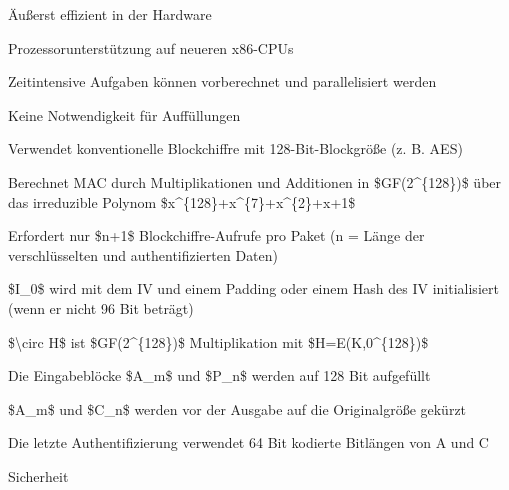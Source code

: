 \documentclass[a4paper]{article}
\begin{document}
\begin{multicols}{3}
\begin{itemize*}
            \begin{itemize*}
                  \item Äußerst effizient in der Hardware
                  \item Prozessorunterstützung auf neueren x86-CPUs
                  \item Zeitintensive Aufgaben können vorberechnet und parallelisiert werden
                  \item Keine Notwendigkeit für Auffüllungen
            \end{itemize*}
            \item
            Verwendet konventionelle Blockchiffre mit 128-Bit-Blockgröße (z. B.
            AES)
            \item
            Berechnet MAC durch Multiplikationen und Additionen in
            \$GF(2\^{}\{128\})\$ über das irreduzible Polynom
            \$x\^{}\{128\}+x\^{}\{7\}+x\^{}\{2\}+x+1\$
            \item
            Erfordert nur \$n+1\$ Blockchiffre-Aufrufe pro Paket (n = Länge der
            verschlüsselten und authentifizierten Daten)

            \begin{itemize*}
                  \item \$I\_0\$ wird mit dem IV und einem Padding oder einem Hash des IV initialisiert (wenn er nicht 96 Bit beträgt)
                  \item \$\textbackslash circ H\$ ist \$GF(2\^{}\{128\})\$ Multiplikation mit \$H=E(K,0\^{}\{128\})\$
                  \item Die Eingabeblöcke \$A\_m\$ und \$P\_n\$ werden auf 128 Bit aufgefüllt
                  \item \$A\_m\$ und \$C\_n\$ werden vor der Ausgabe auf die Originalgröße gekürzt
                  \item Die letzte Authentifizierung verwendet 64 Bit kodierte Bitlängen von A und C
            \end{itemize*}
            \item
            Sicherheit


\end{itemize*}
\end{multicols}
\end{document}
